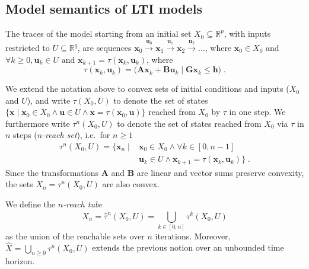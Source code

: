 \documentclass[sigconf]{llncs}
\newcommand{\mat}[1]{\boldsymbol{#1}}
\renewcommand{\vec}[1]{\boldsymbol{#1}}
\begin{document}
\subsection{Model semantics of LTI models}\label{sec:model_semantics}

The traces of the model starting from an initial set $X_0\subseteq \mathbb{R}^p$, 
with inputs restricted to $U \subseteq \mathbb{R}^q$, are sequences 
$ \vec{x}_0 \xrightarrow{\vec{u}_0} \vec{x}_1 \xrightarrow{\vec{u}_1} \vec{x}_2 \xrightarrow{\vec{u}_2} \ldots $, 
%
where $ \vec{x}_0 \in X_0$ and $\forall k\geq 0, \vec{u}_k \in U \text{ and } \vec{x}_{k+1} = \tau(\vec{x}_k,\vec{u}_k) $, 
where 
%
\begin{equation}\label{equ:reachtraj}
\tau(\vec{x}_k,\vec{u}_k) = 
\big( \mat{A}\vec{x}_k +
\mat{B}\vec{u}_k \mid \mat{G}\vec{x}_k \leq \vec{h}\big)\;. 
\end{equation}

\todo{$\mat{G}, \vec{h}$?}

We extend the notation above to convex sets of initial conditions and inputs ($X_0$ and $U$), 
and write $\tau(X_0,U)$ to denote the set of states $\{\vec{x} \mid \vec{x}_0 \in
X_0 \wedge \vec{u} \in U \wedge \vec{x} = \tau(\vec{x}_0,\vec{u})\}$
reached from $X_0$ by $\tau$ in one step. 
%
We furthermore write $\tau^n(X_0,U)$ to denote the set of states reached from
$X_0$ via $\tau$ in $n$ steps (\emph{$n$-reach set}), i.e.\ for $n\geq 1$
%
\begin{align}\label{equ:reachset}
\tau^n(X_0,U) = \{\vec{x}_n \mid &\vec{x}_0 \in X_0 \wedge \forall k\in [0,n-1]\nonumber\\ 
 &\vec{u}_{k} \in U \wedge \vec{x}_{k+1}=\tau(\vec{x}_{k},\vec{u}_{k}) \} \;. 
\end{align}
%
Since the transformations $\mat{A}$ and $\mat{B}$ are linear and
vector sums preserve convexity, the sets $X_n = \tau^n(X_0,U)$ are also
convex.

We define the \emph{$n$-reach tube} 
\begin{equation}\label{equ:reachtube}
\hat{X}_n=\hat{\tau}^n(X_0,U)=\bigcup_{k\in[0,n]} \tau^k(X_0,U)
\end{equation}
as the union of the reachable sets over $n$ iterations.
%
Moreover, $\hat{X} 
=\bigcup_{n\geq 0} \tau^n(X_0,U)$ 
extends the previous notion over an 
unbounded time horizon.
\end{document}
